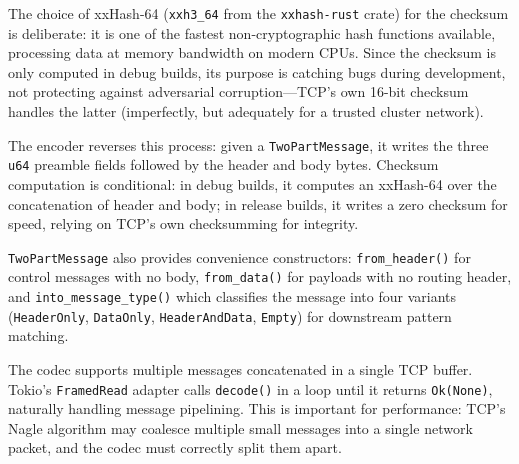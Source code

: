 %
The choice of xxHash-64 (\texttt{xxh3\_64} from the \texttt{xxhash-rust} crate) for the checksum is deliberate: it is one of the fastest non-cryptographic hash functions available, processing data at memory bandwidth on modern CPUs. Since the checksum is only computed in debug builds, its purpose is catching bugs during development, not protecting against adversarial corruption---TCP's own 16-bit checksum handles the latter (imperfectly, but adequately for a trusted cluster network).

The encoder reverses this process: given a \texttt{TwoPartMessage}, it writes the three \texttt{u64} preamble fields followed by the header and body bytes. Checksum computation is conditional: in debug builds, it computes an xxHash-64 over the concatenation of header and body; in release builds, it writes a zero checksum for speed, relying on TCP's own checksumming for integrity.

\texttt{Two\-Part\-Message} also provides convenience constructors: \texttt{from\_header()} for control messages with no body, \texttt{from\_data()} for payloads with no routing header, and \texttt{into\_message\_type()} which classifies the message into four variants (\texttt{Header\-Only}, \texttt{Data\-Only}, \texttt{Header\-And\-Data}, \texttt{Empty}) for downstream pattern matching.

\begin{notebox}
The codec supports multiple messages concatenated in a single TCP buffer. Tokio's \texttt{FramedRead} adapter calls \texttt{decode()} in a loop until it returns \texttt{Ok(None)}, naturally handling message pipelining. This is important for performance: TCP's Nagle algorithm may coalesce multiple small messages into a single network packet, and the codec must correctly split them apart.
\end{notebox}

